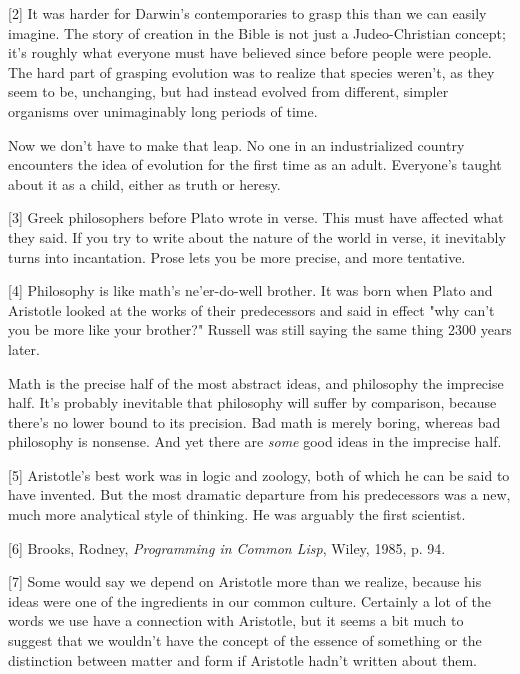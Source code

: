 [2] It was harder for Darwin's contemporaries to grasp this
                  than we can easily imagine. The story of creation in the Bible
                  is not just a Judeo-Christian concept; it's roughly what
                  everyone must have believed since before people were people.
                  The hard part of grasping evolution was to realize that
                  species weren't, as they seem to be, unchanging, but had
                  instead evolved from different, simpler organisms over
                  unimaginably long periods of time.

Now we don't
                  have to make that leap. No one in an industrialized country
                  encounters the idea of evolution for the first time as an
                  adult. Everyone's taught about it as a child, either as truth
                  or heresy.

[3] Greek philosophers before Plato wrote in verse. This must
                  have affected what they said. If you try to write about the
                  nature of the world in verse, it inevitably turns into
                  incantation. Prose lets you be more precise, and more
                  tentative.

[4] Philosophy is like math's ne'er-do-well brother. It was
                  born when Plato and Aristotle looked at the works of their
                  predecessors and said in effect "why can't you be more like
                  your brother?" Russell was still saying the same thing 2300
                  years later.

Math is the precise half of the most
                  abstract ideas, and philosophy the imprecise half. It's
                  probably inevitable that philosophy will suffer by comparison,
                  because there's no lower bound to its precision. Bad math is
                  merely boring, whereas bad philosophy is nonsense. And yet
                  there are \emph{some} good ideas in the imprecise half.

[5] Aristotle's best work was in logic and zoology, both of
                  which he can be said to have invented. But the most dramatic
                  departure from his predecessors was a new, much more
                  analytical style of thinking. He was arguably the first
                  scientist.

[6] Brooks, Rodney, \emph{Programming in Common Lisp}, Wiley,
                  1985, p. 94.

[7] Some would say we depend on Aristotle more than we realize,
                  because his ideas were one of the ingredients in our common
                  culture. Certainly a lot of the words we use have a connection
                  with Aristotle, but it seems a bit much to suggest that we
                  wouldn't have the concept of the essence of something or the
                  distinction between matter and form if Aristotle hadn't
                  written about them.

